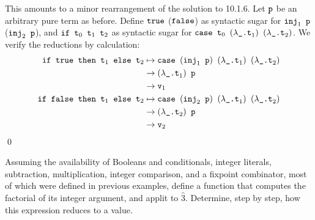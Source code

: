 \documentclass{amsart}
\begin{document}
\begin{solution}
  This amounts to a minor rearrangement of the solution to 10.1.6. Let
  \(\texttt{p}\) be an arbitrary pure term as before. Define \(\texttt{true}\)
  (\(\texttt{false}\)) as syntactic sugar for \(\texttt{inj}_1 \texttt{ p}\)
  (\(\texttt{inj}_2 \texttt{ p}\)), and \(\texttt{if t}_0 \texttt{ t}_1 \texttt{ t}_2\) as
  syntactic sugar for \(\texttt{case t}_0 \texttt{ } (\lambda \texttt{\_.t}_1)
  \texttt{ } (\lambda \texttt{\_.t}_2)\). We verify the reductions by calculation:
  \begin{align*}
    \texttt{if true then t}_1 \texttt{ else t}_2 &\mapsto \texttt{case }
        (\texttt{inj}_1 \texttt{ p}) \texttt{ } (\lambda \texttt{\_.t}_1) \texttt{ }
        (\lambda \texttt{\_.t}_2) \\
    &\to (\lambda \texttt{\_.t}_1) \texttt{ p} \\
    &\to \texttt{v}_1 \\
    \texttt{if false then t}_1 \texttt{ else t}_2 &\mapsto \texttt{case }
        (\texttt{inj}_2 \texttt{ p}) \texttt{ } (\lambda \texttt{\_.t}_1) \texttt{ }
        (\lambda \texttt{\_.t}_2) \\
    &\to (\lambda \texttt{\_.t}_2) \texttt{ p} \\
    &\to \texttt{v}_2
  \end{align*}
  \qed
\end{solution}

\begin{problem}[10.1.11]
  Assuming the availability of Booleans and conditionals, integer literals,
  subtraction, multiplication, integer comparison, and a fixpoint combinator,
  most of which were defined in previous examples, define a function that
  computes the factorial of its integer argument, and applit to \(\hat{3}\).
  Determine, step by step, how this expression reduces to a value.
\end{problem}
\end{document}

